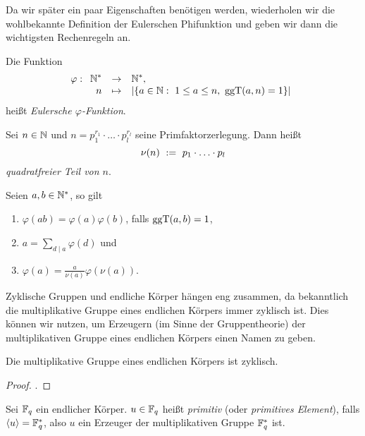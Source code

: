 Da wir später ein paar Eigenschaften benötigen
werden, wiederholen wir die wohlbekannte Definition der Eulerschen
Phifunktion und geben wir dann die wichtigsten Rechenregeln an.

\begin{definition}
  Die Funktion
  \[ \varphi: \funcdef{\N^\ast &\to& \N^\ast,\\
    n &\mapsto& |\{ a \in \N:\ 1\leq a\leq n,\ \ggT(a,n)=1 \}|}\]
  heißt \emph{Eulersche $\varphi$-Funktion}.
\end{definition}

\begin{definition}
  Sei $n \in \mathbb{N}$ und $n = p_1^{r_1}\cdot\ldots\cdot p_l^{r_l}$ seine
  Primfaktorzerlegung. Dann heißt
  \[ \nu(n) \ :=\  p_1\cdot \ldots\cdot p_l\]
  \emph{quadratfreier Teil von $n$}.
\end{definition}


\begin{lemma}
  \label{lemma:rechenregeln_phifunktion}
  Seien $a,b\in\mathbb{N}^\ast$, so gilt
  \begin{enumerate}
    \item $\varphi(ab) = \varphi(a)\varphi(b)$, falls $\operatorname{ggT}(a,b) = 1$,
    \item $a = \sum_{d\mid a} \varphi(d)$ und
    \item $\varphi(a) = \tfrac{a}{\nu(a)}\varphi(\nu(a))$.
  \end{enumerate}
\end{lemma}


Zyklische Gruppen und endliche Körper hängen eng zusammen, da bekanntlich die
multiplikative Gruppe eines endlichen Körpers immer zyklisch ist. Dies können
wir nutzen, um Erzeugern (im Sinne der Gruppentheorie) der multiplikativen
Gruppe eines endlichen Körpers einen Namen zu geben.

\begin{satz}
  \label{satz:mult_gruppe_endl_korper_zyklisch}
  Die multiplikative Gruppe eines endlichen Körpers ist zyklisch.
\end{satz}
\begin{proof}
  \autocite[Theorem 2.8]{lidl1997finite}.
\end{proof}


\begin{definition}[primitiv]
  \label{def:primitiv}
  Sei $\mathbb{F}_q$ ein endlicher Körper. $u\in \mathbb{F}_q$ heißt \emph{primitiv} 
  (oder \emph{primitives Element}), falls $\langle u \rangle = \mathbb{F}_q^\ast$, 
  also $u$ ein Erzeuger der multiplikativen Gruppe $\mathbb{F}_q^\ast$ ist.
\end{definition}


